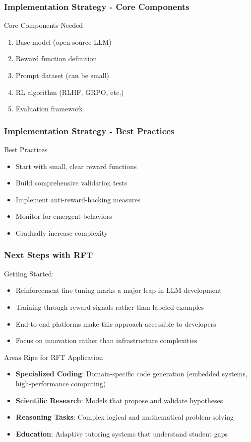 \documentclass[aspectratio=169]{beamer}
\begin{document}
\begin{frame}
	\frametitle{Implementation Strategy - Core Components}
	\begin{block}{Core Components Needed}
		\begin{enumerate}
			\item Base model (open-source LLM)
			\item Reward function definition
			\item Prompt dataset (can be small)
			\item RL algorithm (RLHF, GRPO, etc.)
			\item Evaluation framework
		\end{enumerate}
	\end{block}
\end{frame}

\begin{frame}
	\frametitle{Implementation Strategy - Best Practices}
	\begin{block}{Best Practices}
		\begin{itemize}
			\item Start with small, clear reward functions
			\item Build comprehensive validation tests
			\item Implement anti-reward-hacking measures
			\item Monitor for emergent behaviors
			\item Gradually increase complexity
		\end{itemize}
	\end{block}
\end{frame}

\begin{frame}
	\frametitle{Next Steps with RFT}
	\begin{block}{Getting Started:}
		\begin{itemize}
			\item Reinforcement fine-tuning marks a major leap in LLM development
			\item Training through reward signals rather than labeled examples
			\item End-to-end platforms make this approach accessible to developers
			\item Focus on innovation rather than infrastructure complexities
		\end{itemize}
	\end{block}
	\begin{block}{Areas Ripe for RFT Application}
		\begin{itemize}
			\item \textbf{Specialized Coding}: Domain-specific code generation (embedded systems, high-performance computing)
			\item \textbf{Scientific Research}: Models that propose and validate hypotheses
			\item \textbf{Reasoning Tasks}: Complex logical and mathematical problem-solving
			\item \textbf{Education}: Adaptive tutoring systems that understand student gaps
		\end{itemize}
	\end{block}
\end{frame}
\end{document}
